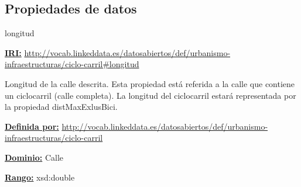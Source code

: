 \subsection{Propiedades de datos}


\begin{mybox}{longitud}
\begin{flushleft}
\underline{\textbf{IRI:}}
\url{http://vocab.linkeddata.es/datosabiertos/def/urbanismo-infraestructuras/ciclo-carril#longitud}
\newline

Longitud de la calle descrita. Esta propiedad está referida a la calle que contiene un ciclocarril (calle completa). La longitud del ciclocarril estará representada por la propiedad distMaxExlusBici.
\newline

\underline{\textbf{Definida por:}}
\url{http://vocab.linkeddata.es/datosabiertos/def/urbanismo-infraestructuras/ciclo-carril}
\newline

\underline{\textbf{Dominio:}}
	Calle
\newline

\underline{\textbf{Rango:}}
		xsd:double
\newline

\end{flushleft}
\end{mybox}



